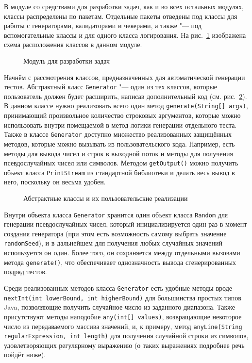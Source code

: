 В модуле со средствами для разработки задач, как и во всех остальных модулях, классы распределены по пакетам. Отдельные пакеты отведены под классы для работы с генераторами, валидаторами и чекерами, а также "--- под вспомогательные классы и для одного класса логирования. На рис.~\ref{package_diagram_development} изображена схема расположения классов в данном модуле.

\begin{figure}[!h]
\caption{Модуль для разработки задач}
\label{package_diagram_development}
\end{figure}

Начнём с рассмотрения классов, предназначенных для автоматической генерации тестов. Абстрактный класс \texttt{Generator} "--- один из тех классов, которые пользователь должен будет расширить, написав дополнительный код (см. рис.~\ref{class_diagram_development}). В данном классе нужно реализовать всего один метод \texttt{generate(String[]~args)}, принимающий произвольное количество строковых аргументов, которые можно использовать внутри помещаемой в метод логики генерации отдельного теста. Также в классе \texttt{Generator} доступно множество реализованных защищённых методов, которые можно вызывать из пользовательского кода. Например, есть методы для вывода чисел и строк в выходной поток и методы для получения псевдослучайных чисел или символов. Методом \texttt{getOutput()} можно получить объект класса \texttt{PrintStream} из стандартной библиотеки и делать весь вывод в него, поскольку он весьма удобен.

\begin{figure}[!h]
\caption{Абстрактные классы и их пользовательские реализации}
\label{class_diagram_development}
\end{figure}

Внутри объекта класса \texttt{Generator} хранится один объект класса \texttt{Random} для генерации псевдослучайных чисел, который инициализируется один раз в момент создания генератора (при этом есть возможность самому выбрать значение \texttt{random\-Seed}), и в дальнейшем для получения любых случайных значений используется он один. Более того, он сохраняется между отдельными вызовами метода \texttt{generate()}, что обеспечивает однозначность вывода сгенерированных подряд тестов.

Среди реализованных методов класса \texttt{Generator} есть удобные методы вроде \texttt{nextInt(int~lowerBound, int~higherBound)} для большинства простых типов Java, позволяющие получить случайное число из заданного диапазона. Также присутствуют методы наподобие \texttt{any(int[]~values)}, возвращающие некоторое число из передаваемого массива значений, и, к примеру, метод \texttt{anyLine(String regular\-Expression, int~length)} для получения случайной строки из символов, удовлетворяющих регулярному выражению (о таких выражениях подробнее речь пойдёт ниже).

